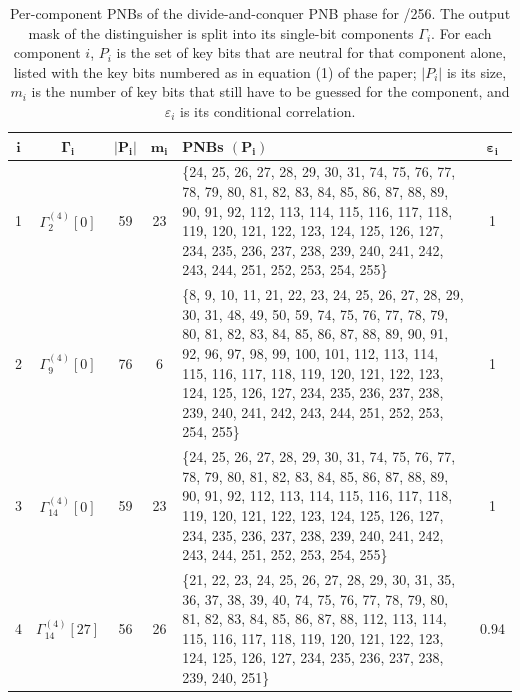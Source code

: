 \begin{table}[!htbp]
\centering
\renewcommand{\arraystretch}{1.6}
\setlength{\tabcolsep}{8pt}
\caption{Per-component PNBs of the divide-and-conquer PNB phase for /256. The output mask of the distinguisher is split into its single-bit components $\Gamma_i$. For each component $i$, $P_i$ is the set of key bits that are neutral for that component alone, listed with the key bits numbered as in equation (1) of the paper; $|P_i|$ is its size, $m_i$ is the number of key bits that still have to be guessed for the component, and $\varepsilon_i$ is its conditional correlation.}
\label{app:pnbtab-55}
\begin{tabular}{@{}cccc p{8cm} c@{}}
\toprule
$\boldsymbol{i}$ & $\boldsymbol{\Gamma_i}$ & $\boldsymbol{|P_i|}$ & $\boldsymbol{m_i}$ & \textbf{PNBs $(\boldsymbol{P_i})$} & $\boldsymbol{\varepsilon_i}$ \\
\midrule
1 & $\Gamma^{(4)}_{2}[0]$ & 59 & 23 &
\{24, 25, 26, 27, 28, 29, 30, 31, 74, 75, 76, 77, 78, 79, 80, 81, 82, 83, 84, 85, 86, 87, 88, 89, 90, 91, 92, 112, 113, 114, 115, 116, 117, 118, 119, 120, 121, 122, 123, 124, 125, 126, 127, 234, 235, 236, 237, 238, 239, 240, 241, 242, 243, 244, 251, 252, 253, 254, 255\} & 1 \\
\midrule
2 & $\Gamma^{(4)}_{9}[0]$ & 76 & 6 &
\{8, 9, 10, 11, 21, 22, 23, 24, 25, 26, 27, 28, 29, 30, 31, 48, 49, 50, 59, 74, 75, 76, 77, 78, 79, 80, 81, 82, 83, 84, 85, 86, 87, 88, 89, 90, 91, 92, 96, 97, 98, 99, 100, 101, 112, 113, 114, 115, 116, 117, 118, 119, 120, 121, 122, 123, 124, 125, 126, 127, 234, 235, 236, 237, 238, 239, 240, 241, 242, 243, 244, 251, 252, 253, 254, 255\} & 1 \\
\midrule
3 & $\Gamma^{(4)}_{14}[0]$ & 59 & 23 &
\{24, 25, 26, 27, 28, 29, 30, 31, 74, 75, 76, 77, 78, 79, 80, 81, 82, 83, 84, 85, 86, 87, 88, 89, 90, 91, 92, 112, 113, 114, 115, 116, 117, 118, 119, 120, 121, 122, 123, 124, 125, 126, 127, 234, 235, 236, 237, 238, 239, 240, 241, 242, 243, 244, 251, 252, 253, 254, 255\} & 1 \\
\midrule
4 & $\Gamma^{(4)}_{14}[27]$ & 56 & 26 &
\{21, 22, 23, 24, 25, 26, 27, 28, 29, 30, 31, 35, 36, 37, 38, 39, 40, 74, 75, 76, 77, 78, 79, 80, 81, 82, 83, 84, 85, 86, 87, 88, 112, 113, 114, 115, 116, 117, 118, 119, 120, 121, 122, 123, 124, 125, 126, 127, 234, 235, 236, 237, 238, 239, 240, 251\} & 0.94 \\
\bottomrule
\end{tabular}
\end{table}

